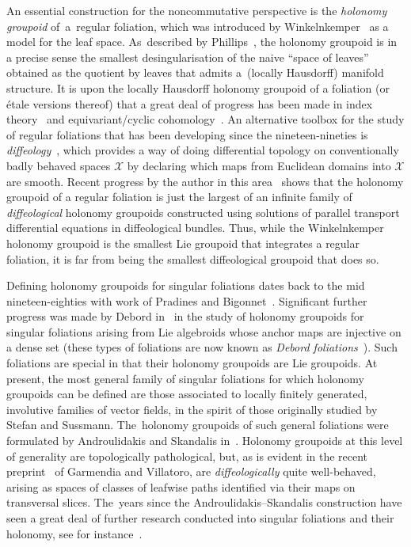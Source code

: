 \documentclass[pdftex]{sigma}
\numberwithin{equation}{section}
\def\XX{{\mathcal{X}}}
\begin{document}
An essential construction for the noncommutative perspective is the \textit{holonomy groupoid} of~a~regular foliation, which was introduced by Winkelnkemper~\cite{wink} as a model for the leaf
space. As~described by Phillips~\cite{holimper}, the holonomy groupoid is in a precise sense the smallest desingularisation of the naive ``space of leaves'' obtained as the quotient by leaves that admits a~(locally Hausdorff) manifold structure. It is upon the locally Hausdorff holonomy groupoid of a foliation (or \'{e}tale versions thereof) that a great deal of progress has been made in index theory~\cite{ben6, ben3, ben4, ben7, ben2, ben5, pcr, cs, goro3, heitsch2, mac2, macr1, ms} and equivariant/cyclic cohomology~\cite{cyctrans,hopf1,diffcyc, backindgeom,crainic1,goro1,goro2,mac1,mosc1, moscorangi}. An alternative toolbox for the study of regular foliations that has been developing since the nineteen-nineties is \textit{diffeology}~\cite{hector, HMVSC}, which provides a way of doing differential topology on conventionally badly behaved spaces $\XX$ by declaring which maps from Euclidean domains into $\XX$ are smooth. Recent progress by the author in this area~\cite{mac3} shows that the holonomy groupoid of a regular foliation is just the largest of an infinite family of \textit{diffeological} holonomy groupoids constructed using solutions of parallel transport differential equations in diffeological bundles. Thus, while the Winkelnkemper holonomy groupoid is the smallest Lie groupoid that integrates a regular foliation, it is far from being the smallest diffeological groupoid that does so.

Defining holonomy groupoids for singular foliations dates back to the mid nineteen-eighties with work of Pradines and Bigonnet~\cite{pradines,pb}. Significant further progress was made by Debord in~\cite{debord, debord2} in the study of holonomy groupoids for singular foliations arising from Lie algebroids whose anchor maps are injective on a dense set (these types of foliations are now known as \textit{Debord foliations}~\cite[Definition~3.6]{lgls}). Such foliations are special in that their holonomy groupoids are Lie groupoids. At present, the most general family of singular foliations for which holonomy groupoids can be defined are those associated to locally finitely generated, involutive families of vector fields, in the spirit of those originally studied by Stefan and Sussmann. The~holonomy groupoids of such general foliations were formulated by Androulidakis and Skandalis in~\cite{iakovos2}. Holonomy groupoids at this level of generality are topologically pathological, but, as is evident in the recent preprint~\cite{VilGar1} of Garmendia and Villatoro, are \textit{diffeologically} quite well-behaved, arising as spaces of classes of leafwise paths identified via their maps on transversal slices. The~years since the Androulidakis--Skandalis construction have seen a great deal of further research conducted into singular foliations and their holonomy, see for instance~\cite{iakovos7,iakovos3,iakovos,iakovos4,ori1,GarZam,VilGar1}.
\end{document}
